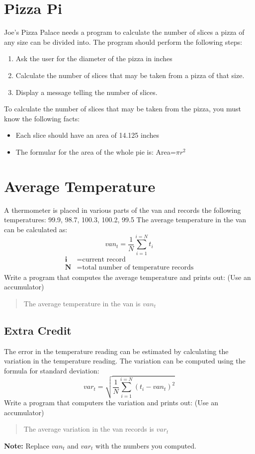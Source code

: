 \documentclass{article}
\begin{document}
\section*{Pizza Pi}
Joe's Pizza Palace needs a program to calculate the number of slices a pizza of any size can be divided into. The program should perform the following steps:
\begin{enumerate}
	\item Ask the user for the diameter of the pizza in inches
	\item Calculate the number of slices that may be taken from a pizza of that size. 
	\item Display a message telling the number of slices.
\end{enumerate}

To calculate the number of slices that may be taken from the pizza, you must know the following facts:
\begin{itemize}
	\item Each slice should have an area of 14.125 inches
	\item The formular for the area of the whole pie is: Area=$\pi r^2$ 
\end{itemize}

\section*{Average Temperature}
A thermometer is placed in various parts of the van and records the following temperatures: 99.9, 98.7, 100.3, 100.2, 99.5 
The average temperature in the van can be calculated as:
\begin{equation}
	van_{t} = \frac{1}{N}\sum_{i=1}^{i=N}t_{i}
\end{equation}
\begin{align*}
	\textbf{i} &= \text{current record}\\
	\textbf{N} &=  \text{total number of temperature records}
\end{align*}
Write a program that computes the average temperature and prints out: (Use an accumulator)
\begin{quote}
	The average temperature in the van is \textit{$van_{t}$}
\end{quote}

\subsection*{Extra Credit}
The error in the temperature reading can be estimated by calculating the variation in the temperature reading. The variation can be computed using the formula for standard deviation:
\begin{equation}
	var_{t} = \sqrt{\frac{1}{N}\sum_{i=1}^{i=N}(t_{i} - van_{t})^{2}}
\end{equation}
Write a program that computers the variation and prints out: (Use an accumulator)
\begin{quote}
	The average variation in the van records is \textit{$var_{t}$}
\end{quote}
\textbf{Note:} Replace $van_{t}$ and $var_{t}$ with the numbers you computed. 
\end{document}
